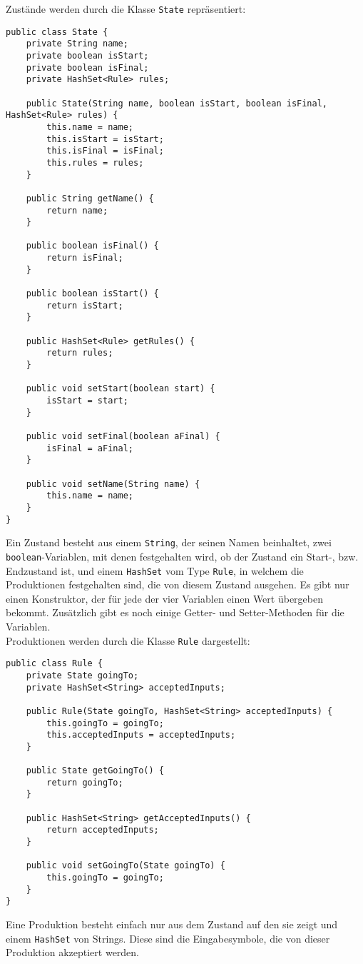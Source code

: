Zustände werden durch die Klasse \lstinline[columns=fixed]{State} repräsentiert:
\begin{lstlisting}[frame=single, basicstyle=\small, caption=Die Klasse \textit{State}]
public class State {
	private String name;	
	private boolean isStart;	
	private boolean isFinal;	
	private HashSet<Rule> rules;
	
	public State(String name, boolean isStart, boolean isFinal, HashSet<Rule> rules) {
		this.name = name;
		this.isStart = isStart;
		this.isFinal = isFinal;
		this.rules = rules;
	}
	
	public String getName() {
		return name;
	}
	
	public boolean isFinal() {
		return isFinal;
	}
	
	public boolean isStart() {
		return isStart;
	}
	
	public HashSet<Rule> getRules() {
		return rules;
	}
	
	public void setStart(boolean start) {
		isStart = start;
	}
	
	public void setFinal(boolean aFinal) {
		isFinal = aFinal;
	}
	
	public void setName(String name) {
		this.name = name;
	}
}
\end{lstlisting}
Ein Zustand besteht aus einem \lstinline[columns=fixed]{String}, der seinen Namen beinhaltet, zwei \lstinline[columns=fixed]{boolean}-Variablen, mit denen festgehalten wird, ob der Zustand ein Start-, bzw. Endzustand ist, und einem \lstinline[columns=fixed]{HashSet} vom Type \lstinline[columns=fixed]{Rule}, in welchem die Produktionen festgehalten sind, die von diesem Zustand ausgehen. Es gibt nur einen Konstruktor, der für jede der vier Variablen einen Wert übergeben bekommt. Zusätzlich gibt es noch einige Getter- und Setter-Methoden für die Variablen.\\
Produktionen werden durch die Klasse \lstinline[columns=fixed]{Rule} dargestellt:
\begin{lstlisting}[frame=single, basicstyle=\small, caption=Die Klasse \textit{Rule}]
public class Rule {
	private State goingTo;
	private HashSet<String> acceptedInputs;
	
	public Rule(State goingTo, HashSet<String> acceptedInputs) {
		this.goingTo = goingTo;
		this.acceptedInputs = acceptedInputs;
	}
	
	public State getGoingTo() {
		return goingTo;
	}
	
	public HashSet<String> getAcceptedInputs() {
		return acceptedInputs;
	}
	
	public void setGoingTo(State goingTo) {
		this.goingTo = goingTo;
	}
}
\end{lstlisting}
Eine Produktion besteht einfach nur aus dem Zustand auf den sie zeigt und einem \lstinline[columns=fixed]{HashSet} von Strings. Diese sind die Eingabesymbole, die von dieser Produktion akzeptiert werden.
